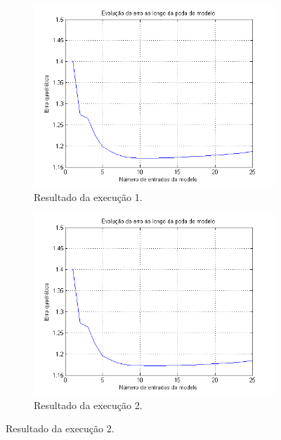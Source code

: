 		\begin{figure}[H] 
				
			\centering
			
				\begin{subfigure}{.5\textwidth}
				  \centering
				  \includegraphics[width=1\linewidth]{image/backward1}
				  \caption{Resultado da execução 1.}
				  \label{backward1}
				\end{subfigure}%
				\begin{subfigure}{.5\textwidth}
				  \centering
				  \includegraphics[width=1\linewidth]{image/backward2}
				  \caption{Resultado da execução 2.}
				  \label{backward2}
			\end{subfigure}
			

\end{figure}
